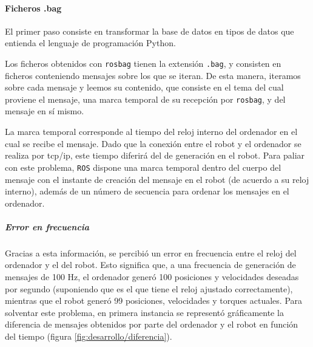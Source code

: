 \paragraph{Ficheros .bag}
El primer paso consiste en transformar la base de datos en tipos de datos que entienda el lenguaje de programación Python.

Los ficheros obtenidos con \verb|rosbag| tienen la extensión \verb|.bag|, y consisten en ficheros conteniendo mensajes sobre los que se iteran. De esta manera, iteramos sobre cada mensaje y leemos su contenido, que consiste en el tema del cual proviene el mensaje, una marca temporal de su recepción por \verb|rosbag|, y del mensaje en sí mismo.

La marca temporal corresponde al tiempo del reloj interno del ordenador en el cual se recibe el mensaje. Dado que la conexión entre el robot y el ordenador se realiza por tcp/ip, este tiempo diferirá del de generación en el robot. Para paliar con este problema, \verb|ROS| dispone una marca temporal dentro del cuerpo del mensaje con el instante de creación del mensaje en el robot (de acuerdo a su reloj interno), además de un número de secuencia para ordenar los mensajes en el ordenador.

\subparagraph{Error en frecuencia}
Gracias a esta información, se percibió un error en frecuencia entre el reloj del ordenador y el del robot. Esto significa que, a una frecuencia de generación de mensajes de 100 Hz, el ordenador generó 100 posiciones y velocidades deseadas por segundo (suponiendo que es el que tiene el reloj ajustado correctamente), mientras que el robot generó 99 posiciones, velocidades y torques actuales. Para solventar este problema, en primera instancia se representó gráficamente la diferencia de mensajes obtenidos por parte del ordenador y el robot en función del tiempo (figura \ref{fig:desarrollo/diferencia}).

